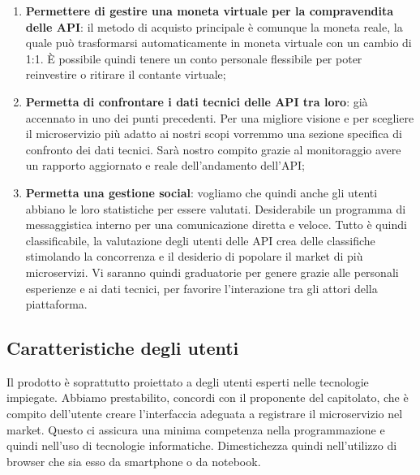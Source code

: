 \documentclass[12pt,a4paper,titlepage]{article}
\begin{document}
\begin{enumerate}
		\item \textbf{Permettere di gestire una moneta virtuale per la compravendita delle API}: il metodo di acquisto principale è comunque la moneta reale, la quale può trasformarsi automaticamente in moneta virtuale con un cambio di 1:1. È possibile quindi tenere un conto personale flessibile per poter reinvestire o ritirare il contante virtuale;
		\item \textbf{Permetta di confrontare i dati tecnici delle API tra loro}: già accennato in uno dei punti precedenti. Per una migliore visione e per scegliere il microservizio più adatto ai nostri scopi vorremmo una sezione specifica di confronto dei dati tecnici. Sarà nostro compito grazie al monitoraggio avere un rapporto aggiornato e reale dell'andamento dell'API;
		\item \textbf{Permetta una gestione social}: vogliamo che quindi anche gli utenti abbiano le loro statistiche per essere valutati. Desiderabile un programma di messaggistica interno per una comunicazione diretta e veloce. Tutto è quindi classificabile, la valutazione degli utenti delle API crea delle classifiche stimolando la concorrenza e il desiderio di popolare il market di più microservizi. Vi saranno quindi graduatorie per genere grazie alle personali esperienze e ai dati tecnici, per favorire l'interazione tra gli attori della piattaforma.
	\end{enumerate}
	
	\subsection{Caratteristiche degli utenti}
	Il prodotto è soprattutto proiettato a degli utenti esperti nelle tecnologie impiegate. Abbiamo prestabilito, concordi con il proponente del capitolato, che è compito dell'utente creare l'interfaccia adeguata a registrare il microservizio nel market. Questo ci assicura una minima competenza nella programmazione e quindi nell'uso di tecnologie informatiche. Dimestichezza quindi nell'utilizzo di browser che sia esso da smartphone o da notebook. 
	
\end{document}
